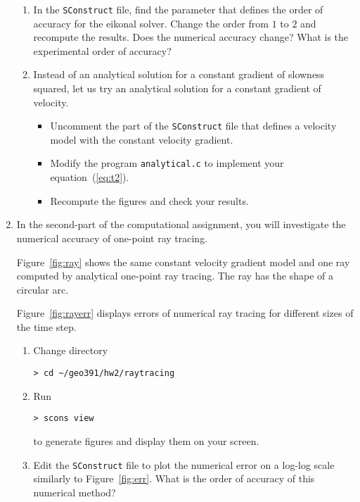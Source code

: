 \begin{enumerate}
\begin{enumerate}
  \item In the \texttt{SConstruct} file, find the parameter that
    defines the order of accuracy for the eikonal solver. Change the
    order from $1$ to $2$ and recompute the results. Does the
    numerical accuracy change? What is the experimental order of
    accuracy? 
  \item Instead of an analytical solution for a constant 
    gradient of slowness squared, let us try an analytical solution for a constant
    gradient of velocity. 
    \begin{itemize}
    \item Uncomment the part of the
    \texttt{SConstruct} file that defines a velocity model with the
    constant velocity gradient. 
    \item Modify the program \texttt{analytical.c} to implement your equation~(\ref{eq:t2}).
    \item Recompute the figures and check your results.
    \end{itemize}
  \end{enumerate}

\lstset{language=c,numbers=left,numberstyle=\tiny,showstringspaces=false}



\item In the second-part of the computational assignment, you will investigate the numerical accuracy of one-point ray tracing.


\lstset{language=python,numbers=left,numberstyle=\tiny,showstringspaces=false}


  Figure~\ref{fig:ray} shows the same constant velocity gradient model
  and one ray computed by analytical one-point ray tracing. The ray has the shape of a circular arc.


  Figure~\ref{fig:rayerr} displays errors of numerical ray tracing for
  different sizes of the time step. 


    \begin{enumerate}
  \item Change directory 
\begin{verbatim}
> cd ~/geo391/hw2/raytracing
\end{verbatim}
  \item Run
\begin{verbatim}
> scons view
\end{verbatim}
    to generate figures and display them on your screen.  
  \item Edit the \texttt{SConstruct} file to plot the numerical error
    on a log-log scale similarly to Figure~\ref{fig:err}. What is the
    order of accuracy of this numerical method?
  \end{enumerate}
  

\end{enumerate}
